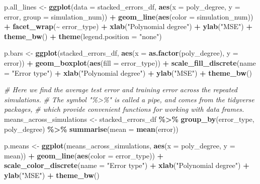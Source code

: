 \documentclass[
]{article}
\newenvironment{Shaded}{\begin{snugshade}}{\end{snugshade}}
\newcommand{\AttributeTok}[1]{\textcolor[rgb]{0.13,0.29,0.53}{#1}}
\newcommand{\CommentTok}[1]{\textcolor[rgb]{0.56,0.35,0.01}{\textit{#1}}}
\newcommand{\FunctionTok}[1]{\textcolor[rgb]{0.13,0.29,0.53}{\textbf{#1}}}
\newcommand{\NormalTok}[1]{#1}
\newcommand{\OtherTok}[1]{\textcolor[rgb]{0.56,0.35,0.01}{#1}}
\newcommand{\SpecialCharTok}[1]{\textcolor[rgb]{0.81,0.36,0.00}{\textbf{#1}}}
\newcommand{\StringTok}[1]{\textcolor[rgb]{0.31,0.60,0.02}{#1}}
\begin{document}
\begin{Shaded}
\begin{Highlighting}[]
\NormalTok{p.all\_lines }\OtherTok{\textless{}{-}} \FunctionTok{ggplot}\NormalTok{(}\AttributeTok{data =}\NormalTok{ stacked\_errors\_df, }
                      \FunctionTok{aes}\NormalTok{(}\AttributeTok{x =}\NormalTok{ poly\_degree, }\AttributeTok{y =}\NormalTok{ error, }\AttributeTok{group =}\NormalTok{ simulation\_num)) }\SpecialCharTok{+}
  \FunctionTok{geom\_line}\NormalTok{(}\FunctionTok{aes}\NormalTok{(}\AttributeTok{color =}\NormalTok{ simulation\_num)) }\SpecialCharTok{+}
  \FunctionTok{facet\_wrap}\NormalTok{(}\SpecialCharTok{\textasciitilde{}}\NormalTok{ error\_type) }\SpecialCharTok{+}
  \FunctionTok{xlab}\NormalTok{(}\StringTok{"Polynomial degree"}\NormalTok{) }\SpecialCharTok{+}
  \FunctionTok{ylab}\NormalTok{(}\StringTok{"MSE"}\NormalTok{) }\SpecialCharTok{+}
  \FunctionTok{theme\_bw}\NormalTok{() }\SpecialCharTok{+}
  \FunctionTok{theme}\NormalTok{(}\AttributeTok{legend.position =} \StringTok{"none"}\NormalTok{)}

\NormalTok{p.bars }\OtherTok{\textless{}{-}} \FunctionTok{ggplot}\NormalTok{(stacked\_errors\_df, }\FunctionTok{aes}\NormalTok{(}\AttributeTok{x =} \FunctionTok{as.factor}\NormalTok{(poly\_degree), }\AttributeTok{y =}\NormalTok{ error)) }\SpecialCharTok{+}
  \FunctionTok{geom\_boxplot}\NormalTok{(}\FunctionTok{aes}\NormalTok{(}\AttributeTok{fill =}\NormalTok{ error\_type)) }\SpecialCharTok{+}
  \FunctionTok{scale\_fill\_discrete}\NormalTok{(}\AttributeTok{name =} \StringTok{"Error type"}\NormalTok{) }\SpecialCharTok{+}
  \FunctionTok{xlab}\NormalTok{(}\StringTok{"Polynomial degree"}\NormalTok{) }\SpecialCharTok{+}
  \FunctionTok{ylab}\NormalTok{(}\StringTok{"MSE"}\NormalTok{) }\SpecialCharTok{+}
  \FunctionTok{theme\_bw}\NormalTok{()}

\CommentTok{\# Here we find the average test error and training error across the repeated simulations. }
\CommentTok{\# The symbol "\%\textgreater{}\%" is called a pipe, and comes from the tidyverse packages, }
\CommentTok{\# which provide convenient functions for working with data frames.}
\NormalTok{means\_across\_simulations }\OtherTok{\textless{}{-}}\NormalTok{ stacked\_errors\_df }\SpecialCharTok{\%\textgreater{}\%} 
  \FunctionTok{group\_by}\NormalTok{(error\_type, poly\_degree) }\SpecialCharTok{\%\textgreater{}\%} 
  \FunctionTok{summarise}\NormalTok{(}\AttributeTok{mean =} \FunctionTok{mean}\NormalTok{(error))}

\NormalTok{p.means }\OtherTok{\textless{}{-}} \FunctionTok{ggplot}\NormalTok{(means\_across\_simulations, }\FunctionTok{aes}\NormalTok{(}\AttributeTok{x =}\NormalTok{ poly\_degree, }\AttributeTok{y =}\NormalTok{ mean)) }\SpecialCharTok{+}
  \FunctionTok{geom\_line}\NormalTok{(}\FunctionTok{aes}\NormalTok{(}\AttributeTok{color =}\NormalTok{ error\_type)) }\SpecialCharTok{+}
  \FunctionTok{scale\_color\_discrete}\NormalTok{(}\AttributeTok{name =} \StringTok{"Error type"}\NormalTok{) }\SpecialCharTok{+}
  \FunctionTok{xlab}\NormalTok{(}\StringTok{"Polynomial degree"}\NormalTok{) }\SpecialCharTok{+}
  \FunctionTok{ylab}\NormalTok{(}\StringTok{"MSE"}\NormalTok{) }\SpecialCharTok{+}
  \FunctionTok{theme\_bw}\NormalTok{()}


\end{Highlighting}
\end{Shaded}
\end{document}
